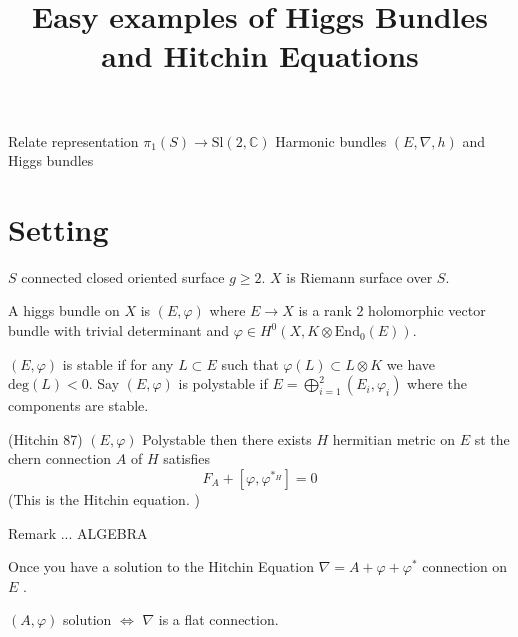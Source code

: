 % 

\title{Easy examples of Higgs Bundles and Hitchin Equations}
\author{}
\date{}

 
\maketitle

Relate representation $ \pi_1 ( S) \rightarrow  \mathrm{Sl}(2, \mathbb{C} ) $ 
Harmonic bundles $ ( E, \nabla, h )$ 
and Higgs bundles 

\section{Setting} %
$S$ connected closed oriented surface $ g \geq 2 $. 
$X$ is Riemann surface over $ S$. 

\begin{definition}
    A higgs bundle on $X$ is $(E, \varphi)$ 
    where $E \rightarrow  X $ is a rank $2$ holomorphic vector bundle 
    with trivial determinant and $ \varphi \in H^0 ( X, K \otimes \mathrm{End} _0 (E) ) $.
\end{definition}

\begin{definition}
    $(E, \varphi)$ is stable if for any $L \subset E $ such that $ \varphi(L) \subset L \otimes K $ 
    we have $\mathrm{deg}(L) < 0 $. 
    Say $ (E, \varphi ) $ is polystable if $ E = \bigoplus_{i = 1} ^2  ( E_i , \varphi _i ) $ where the components are stable.
\end{definition}

\begin{theorem}
 (Hitchin 87) 
    $( E, \varphi) $ Polystable then there exists $H$ hermitian metric on $E$ st 
    the chern connection $ A $ of $H$ satisfies 
    \begin{equation}
        F _A + [ \varphi , \varphi ^{*_H} ] = 0  
    \end{equation}
    (This is the Hitchin equation. ) 
\end{theorem}

Remark ... 
ALGEBRA 

Once you have a solution to the Hitchin Equation 
$\nabla = A +\varphi + \varphi^* $ connection on $E$ . 

$(A, \varphi)$ solution $\Leftrightarrow$ $\nabla $ is a flat connection. 

